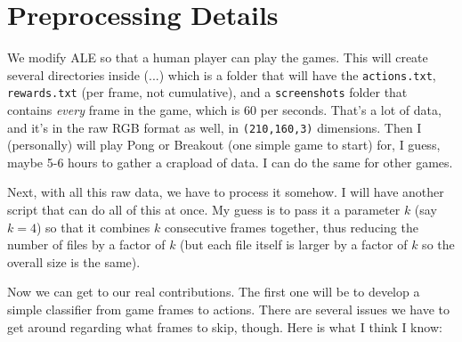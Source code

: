 \documentclass[letterpaper, 10pt, conference]{ieeeconf}
\begin{document}



\appendices

\section{Preprocessing Details}\label{app:preprocessing_details}

We modify ALE so that a human player can play the games. This will
    create several directories inside (...)
    which is a folder that will have the \texttt{actions.txt},
    \texttt{rewards.txt} (per frame, not cumulative), and a \texttt{screenshots}
    folder that contains \emph{every} frame in the game, which is 60 per
    seconds. That's a lot of data, and it's in the raw RGB format as well, in
    \texttt{(210,160,3)} dimensions.  Then I (personally) will play Pong or
    Breakout (one simple game to start) for, I guess, maybe 5-6 hours to gather
    a crapload of data. I can do the same for other games.

Next, with all this raw data, we have to process it somehow. I will
    have another script that can do all of this at once. My guess is to pass it
    a parameter $k$ (say $k=4$) so that it combines $k$ consecutive frames
    together, thus reducing the number of files by a factor of $k$ (but each
    file itself is larger by a factor of $k$ so the overall size is the same).

Now we can get to our real contributions. The first one will be to
    develop a simple classifier from game frames to actions. There are several
    issues we have to get around regarding what frames to skip, though. Here is
    what I think I know:
\end{document}
